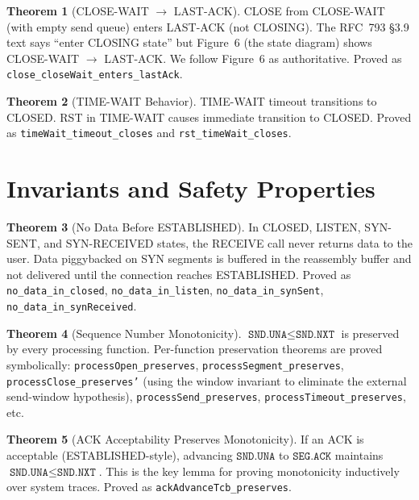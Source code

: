 \documentclass[11pt]{article}
\theoremstyle{definition}
\newtheorem{theorem}{Theorem}[section]
\begin{document}
\begin{theorem}[CLOSE-WAIT $\to$ LAST-ACK]
CLOSE from CLOSE-WAIT (with empty send queue) enters LAST-ACK (not CLOSING).
The RFC~793 \S3.9 text says ``enter CLOSING state'' but Figure~6 (the state
diagram) shows CLOSE-WAIT $\to$ LAST-ACK. We follow Figure~6 as
authoritative.
Proved as \texttt{close\_closeWait\_enters\_lastAck}.
\end{theorem}

\begin{theorem}[TIME-WAIT Behavior]
TIME-WAIT timeout transitions to CLOSED. RST in TIME-WAIT causes immediate
transition to CLOSED.
Proved as \texttt{timeWait\_timeout\_closes} and
\texttt{rst\_timeWait\_closes}.
\end{theorem}

\section{Invariants and Safety Properties}
\label{sec:invariants}

\begin{theorem}[No Data Before ESTABLISHED]
In CLOSED, LISTEN, SYN-SENT, and SYN-RECEIVED states, the RECEIVE call never
returns data to the user. Data piggybacked on SYN segments is buffered in the
reassembly buffer and not delivered until the connection reaches ESTABLISHED.
Proved as \texttt{no\_data\_in\_closed}, \texttt{no\_data\_in\_listen},
\texttt{no\_data\_in\_synSent}, \texttt{no\_data\_in\_synReceived}.
\end{theorem}

\begin{theorem}[Sequence Number Monotonicity]
$\texttt{SND.UNA} \leq \texttt{SND.NXT}$ is preserved by every processing
function. Per-function preservation theorems are proved symbolically:
\texttt{processOpen\_preserves}, \texttt{processSegment\_preserves},
\texttt{processClose\_preserves'} (using the window invariant to eliminate
the external send-window hypothesis), \texttt{processSend\_preserves},
\texttt{processTimeout\_preserves}, etc.
\end{theorem}

\begin{theorem}[ACK Acceptability Preserves Monotonicity]
If an ACK is acceptable (ESTABLISHED-style), advancing $\texttt{SND.UNA}$ to
$\texttt{SEG.ACK}$ maintains $\texttt{SND.UNA} \leq \texttt{SND.NXT}$.
This is the key lemma for proving monotonicity inductively over system traces.
Proved as \texttt{ackAdvanceTcb\_preserves}.
\end{theorem}
\end{document}
